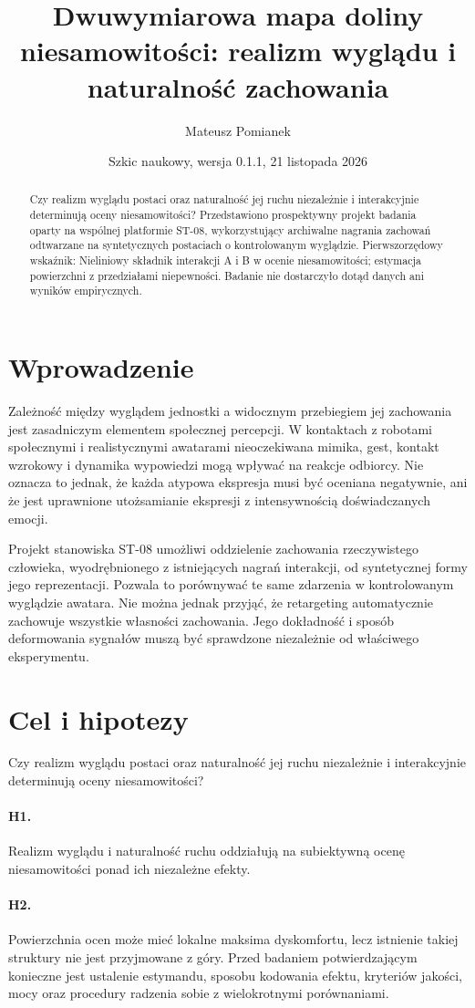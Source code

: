 \documentclass[11pt,a4paper]{article}
\title{Dwuwymiarowa mapa doliny niesamowitości: realizm wyglądu i naturalność zachowania}
\author{Mateusz Pomianek}
\date{Szkic naukowy, wersja 0.1.1, 21 listopada 2026}
\begin{document}
\maketitle
\begin{abstract}
Czy realizm wyglądu postaci oraz naturalność jej ruchu niezależnie i interakcyjnie determinują oceny niesamowitości? Przedstawiono prospektywny projekt badania oparty na wspólnej platformie ST-08, wykorzystujący archiwalne nagrania zachowań odtwarzane na syntetycznych postaciach o kontrolowanym wyglądzie. Pierwszorzędowy wskaźnik: Nieliniowy składnik interakcji A i B w ocenie niesamowitości; estymacja powierzchni z przedziałami niepewności. Badanie nie dostarczyło dotąd danych ani wyników empirycznych.
\end{abstract}
\section{Wprowadzenie}
Zależność między wyglądem jednostki a widocznym przebiegiem jej zachowania jest zasadniczym elementem społecznej percepcji. W kontaktach z robotami społecznymi i realistycznymi awatarami nieoczekiwana mimika, gest, kontakt wzrokowy i dynamika wypowiedzi mogą wpływać na reakcje odbiorcy. Nie oznacza to jednak, że każda atypowa ekspresja musi być oceniana negatywnie, ani że jest uprawnione utożsamianie ekspresji z intensywnością doświadczanych emocji.

Projekt stanowiska ST-08 umożliwi oddzielenie zachowania rzeczywistego człowieka, wyodrębnionego z istniejących nagrań interakcji, od syntetycznej formy jego reprezentacji. Pozwala to porównywać te same zdarzenia w kontrolowanym wyglądzie awatara. Nie można jednak przyjąć, że retargeting automatycznie zachowuje wszystkie własności zachowania. Jego dokładność i sposób deformowania sygnałów muszą być sprawdzone niezależnie od właściwego eksperymentu.
\section{Cel i hipotezy}
Czy realizm wyglądu postaci oraz naturalność jej ruchu niezależnie i interakcyjnie determinują oceny niesamowitości?
\paragraph{H1.} Realizm wyglądu i naturalność ruchu oddziałują na subiektywną ocenę niesamowitości ponad ich niezależne efekty.
\paragraph{H2.} Powierzchnia ocen może mieć lokalne maksima dyskomfortu, lecz istnienie takiej struktury nie jest przyjmowane z góry.
Przed badaniem potwierdzającym konieczne jest ustalenie estymandu, sposobu kodowania efektu, kryteriów jakości, mocy oraz procedury radzenia sobie z wielokrotnymi porównaniami.
\end{document}

